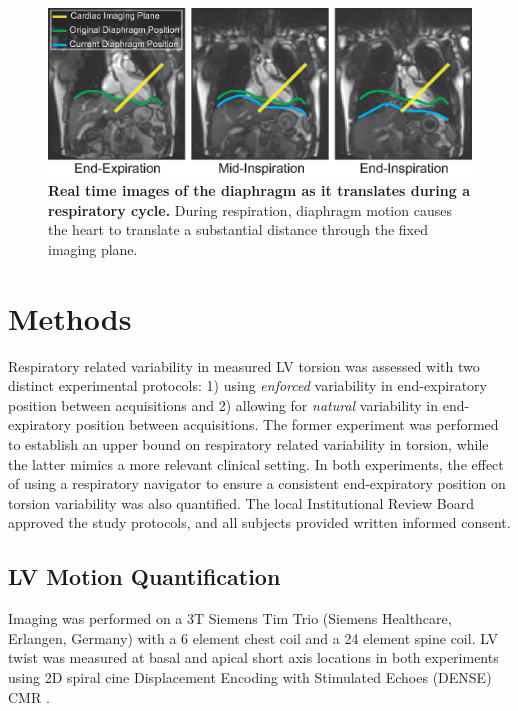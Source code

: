 	\begin{figure}
		\includegraphics{figures/torsionpaper/Fig2-range_of_diaphragm_position_breathing}
		\caption[Real time images of the diaphragm as it translates during a respiratory cycle]{\textbf{Real time images of the diaphragm as it translates during a respiratory cycle.} During respiration, diaphragm motion causes the heart to translate a substantial distance through the fixed imaging plane.}
		\label{fig:diaphragmtranslation}
	\end{figure}

\section{Methods}
	Respiratory related variability in measured LV torsion was assessed with two distinct experimental protocols: 1) using \textit{enforced} variability in end-expiratory position between acquisitions and 2) allowing for \textit{natural} variability in end-expiratory position between acquisitions. The former experiment was performed to establish an upper bound on respiratory related variability in torsion, while the latter mimics a more relevant clinical setting. In both experiments, the effect of using a respiratory navigator to ensure a consistent end-expiratory position on torsion variability was also quantified. The local Institutional Review Board approved the study protocols, and all subjects provided written informed consent.

\subsection{LV Motion Quantification}
	Imaging was performed on a 3T Siemens Tim Trio (Siemens Healthcare, Erlangen, Germany) with a 6 element chest coil and a 24 element spine coil. LV twist was measured at basal and apical short axis locations in both experiments using 2D spiral cine Displacement Encoding with Stimulated Echoes (DENSE) CMR \cite{Zhong2010a,Wehner2015}.
	
